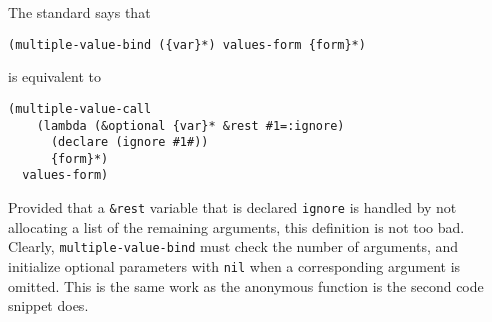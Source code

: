 The standard says that

\begin{verbatim}
(multiple-value-bind ({var}*) values-form {form}*)
\end{verbatim}

is equivalent to

\begin{verbatim}
(multiple-value-call
    (lambda (&optional {var}* &rest #1=:ignore)
      (declare (ignore #1#))
      {form}*)
  values-form)
\end{verbatim}

Provided that a \texttt{\&rest} variable that is declared
\texttt{ignore} is handled by not allocating a list of the remaining
arguments, this definition is not too bad.  Clearly,
\texttt{multiple-value-bind} must check the number of arguments, and
initialize optional parameters with \texttt{nil} when a corresponding
argument is omitted.  This is the same work as the anonymous function
is the second code snippet does. 


